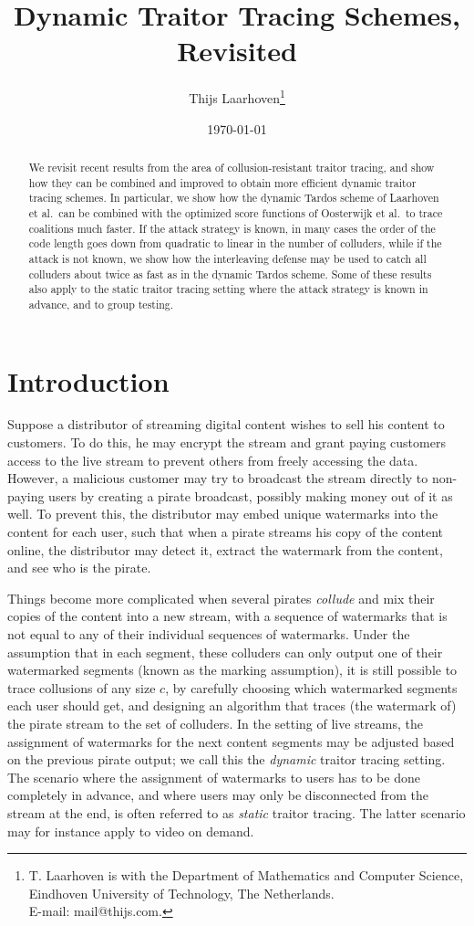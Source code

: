 \documentclass[10pt,a4paper,twocolumn]{article}
\title{Dynamic Traitor Tracing Schemes, Revisited}
\author{Thijs Laarhoven\footnote{T. Laarhoven is with the Department of Mathematics and Computer Science, Eindhoven University of Technology, The Netherlands. \protect\\
E-mail: mail@thijs.com.}}
\date{\today}
\begin{document}
\maketitle

\begin{abstract}
We revisit recent results from the area of collusion-resistant traitor tracing, and show how they can be combined and improved to obtain more efficient dynamic traitor tracing schemes. In particular, we show how the dynamic Tardos scheme of Laarhoven et al.\ can be combined with the optimized score functions of Oosterwijk et al.\ to trace coalitions much faster. If the attack strategy is known, in many cases the order of the code length goes down from quadratic to linear in the number of colluders, while if the attack is not known, we show how the interleaving defense may be used to catch all colluders about twice as fast as in the dynamic Tardos scheme. Some of these results also apply to the static traitor tracing setting where the attack strategy is known in advance, and to group testing.
\end{abstract}




\section{Introduction}
\label{sec:intro}

Suppose a distributor of streaming digital content wishes to sell his content to customers. To do this, he may encrypt the stream and grant paying customers access to the live stream to prevent others from freely accessing the data. However, a malicious customer may try to broadcast the stream directly to non-paying users by creating a pirate broadcast, possibly making money out of it as well. To prevent this, the distributor may embed unique watermarks into the content for each user, such that when a pirate streams his copy of the content online, the distributor may detect it, extract the watermark from the content, and see who is the pirate. 

Things become more complicated when several pirates \textit{collude} and mix their copies of the content into a new stream, with a sequence of watermarks that is not equal to any of their individual sequences of watermarks. Under the assumption that in each segment, these colluders can only output one of their watermarked segments (known as the marking assumption), it is still possible to trace collusions of any size $c$, by carefully choosing which watermarked segments each user should get, and designing an algorithm that traces (the watermark of) the pirate stream to the set of colluders. In the setting of live streams, the assignment of watermarks for the next content segments may be adjusted based on the previous pirate output; we call this the \textit{dynamic} traitor tracing setting. The scenario where the assignment of watermarks to users has to be done completely in advance, and where users may only be disconnected from the stream at the end, is often referred to as \textit{static} traitor tracing. The latter scenario may for instance apply to video on demand. 
\end{document}
